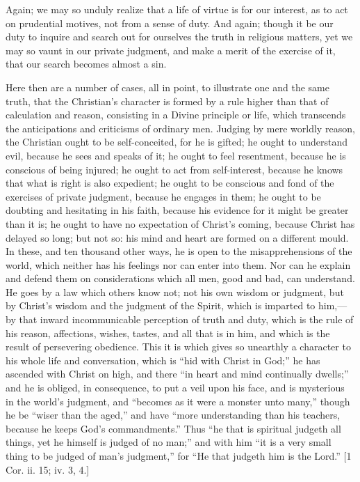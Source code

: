 Again; we may so unduly realize that a life of virtue is for our
interest, as to act on prudential motives, not from a sense of duty.
And again; though it be our duty to inquire and search out for
ourselves the truth in religious matters, yet we may so vaunt in our
private judgment, and make a merit of the exercise of it, that our
search becomes almost a sin.

Here then are a number of cases, all in point, to illustrate one
and the same truth, that the Christian's character is formed by a rule
higher than that of calculation and reason, consisting in a Divine
principle or life, which transcends the anticipations and criticisms
of ordinary men. Judging by mere worldly reason, the Christian ought
to be self-conceited, for he is gifted; he ought to understand evil,
because he sees and speaks of it; he ought to feel resentment, because
he is conscious of being injured; he ought to act from self-interest,
because he knows that what is right is also expedient; he ought to be
conscious and fond of the exercises of private judgment, because he
engages in them; he ought to be doubting and hesitating in his faith,
because his evidence for it might be greater than it is; he ought to
have no expectation of Christ's coming, because Christ has delayed so
long; but not so: his mind and heart are formed on a different mould.
In these, and ten thousand other ways, he is open to the
misapprehensions of the world, which neither has his feelings nor can
enter into them. Nor can he explain and defend them on considerations
which all men, good and bad, can understand. He goes by a law which
others know not; not his own wisdom or judgment, but by Christ's
wisdom and the judgment of the Spirit, which is imparted to him,—by
that inward incommunicable perception of truth and duty, which is the
rule of his reason, affections, wishes, tastes, and all that is in
him, and which is the result of persevering obedience. This it is
which gives so unearthly a character to his whole life and
conversation, which is ``hid with Christ in God;'' he has
ascended with Christ on high, and there ``in heart and mind
continually dwells;'' and he is obliged, in consequence, to put a
veil upon his face, and is mysterious in the world's judgment, and
``becomes as it were a monster unto many,'' though he be
``wiser than the aged,'' and have ``more understanding
than his teachers, because he keeps God's commandments.'' Thus
``he that is spiritual judgeth all things, yet he himself is
judged of no man;'' and with him ``it is a very small thing to
be judged of man's judgment,'' for ``He that judgeth him is
the Lord.'' [1 Cor. ii. 15; iv. 3, 4.]

